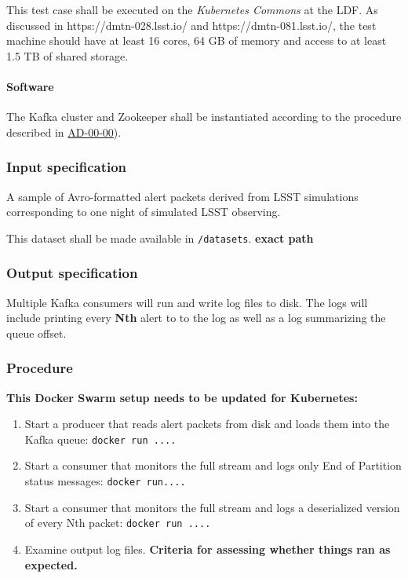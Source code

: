 This test case shall be executed on the \textit{Kubernetes Commons} at the LDF.
As discussed in https://dmtn-028.lsst.io/ and https://dmtn-081.lsst.io/, the test machine should have at least 16 cores, 64 GB of memory and access to at least 1.5 TB of shared storage.

\paragraph{Software}

The Kafka cluster and Zookeeper shall be instantiated according to the 
procedure described in \hyperref[ad-00-00]{AD-00-00}).

\subsubsection{Input specification}

A sample of Avro-formatted alert packets derived from LSST simulations corresponding to one night of simulated LSST observing.

This dataset shall be made available in \texttt{/datasets}.  \textbf{exact path}

\subsubsection{Output specification}

Multiple Kafka consumers will run and write log files to disk.  
The logs will include printing every \textbf{Nth} alert to to the log as well as a log summarizing the queue offset.

\subsubsection{Procedure}
\textbf{This Docker Swarm setup needs to be updated for Kubernetes:}


\begin{enumerate}

	\item{Start a producer that reads alert packets from disk and loads them into the Kafka queue:   \texttt{docker run ....}}

	\item{Start a consumer that monitors the full stream and logs only End of Partition status messages:  \texttt{docker run....}}

	\item{Start a consumer that monitors the full stream and logs a deserialized version of every Nth packet:  \texttt{docker run ....}}

	\item{Examine output log files.  \textbf{Criteria for assessing whether things ran as expected.}}

\end{enumerate}
